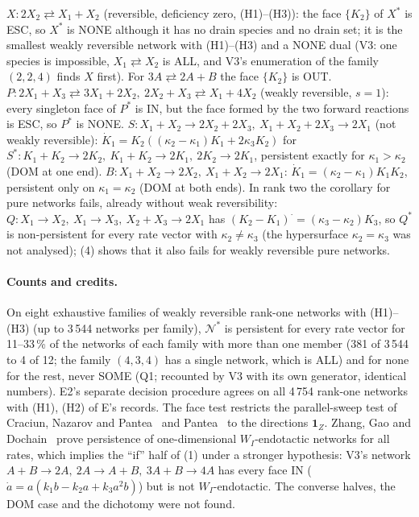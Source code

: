\documentclass[11pt,a4paper]{report}
\newcommand{\Nd}{\mathcal{N}^{*}}
\begin{document}
\begin{example}\label{ex:S1}
\(X\colon 2X_2\rightleftarrows X_1+X_2\) (reversible, deficiency zero, (H1)--(H3)): the face \(\{K_2\}\) of
\(X^*\) is ESC, so \(X^*\) is NONE although it has no drain species and no drain set; it is the smallest weakly
reversible network with (H1)--(H3) and a NONE dual (V3: one species is impossible, \(X_1\rightleftarrows X_2\) is ALL,
and V3's enumeration of the family \((2,2,4)\) finds \(X\) first). For \(3A\rightleftarrows2A+B\) the face \(\{K_2\}\) is OUT.
\(P\colon 2X_1+X_3\rightleftarrows3X_1+2X_2,\ 2X_2+X_3\rightleftarrows X_1+4X_2\) (weakly reversible, \(s=1\)): every
singleton face of \(P^*\) is IN, but the face formed by the two forward reactions is ESC, so \(P^*\) is NONE.
\(S\colon X_1+X_2\to2X_2+2X_3,\ X_1+X_2+2X_3\to2X_1\) (not weakly reversible): \(\dot K_1=K_2((\kappa_2-\kappa_1)K_1+2\kappa_3K_2)\)
for \(S^*\colon K_1+K_2\to2K_2,\ K_1+K_2\to2K_1,\ 2K_2\to2K_1\), persistent exactly for \(\kappa_1>\kappa_2\) (DOM at one end).
\(B\colon X_1+X_2\to2X_2,\ X_1+X_2\to2X_1\): \(\dot K_1=(\kappa_2-\kappa_1)K_1K_2\), persistent only on \(\kappa_1=\kappa_2\) (DOM at both
ends). In rank two the corollary for pure networks fails, already without weak reversibility:
\(Q\colon X_1\to X_2,\ X_1\to X_3,\ X_2+X_3\to2X_1\) has \((K_2-K_1)^\cdot=(\kappa_3-\kappa_2)K_3\), so \(Q^*\) is
non-persistent for every rate vector with \(\kappa_2\neq\kappa_3\) (the hypersurface \(\kappa_2=\kappa_3\) was not
analysed); (4) shows that it also fails for weakly reversible pure networks.
\end{example}

\paragraph{Counts and credits.} On eight exhaustive families of weakly reversible rank-one networks with (H1)--(H3)
(up to 3\,544 networks per family), \(\Nd\) is persistent for every rate vector for 11--33\,\% of the networks of each
family with more than one member (381 of 3\,544 to 4 of 12; the family \((4,3,4)\) has a single network, which is ALL)
and for none for the rest, never SOME (Q1; recounted by V3 with its own generator, identical numbers). E2's separate
decision procedure agrees on
all 4\,754 rank-one networks with (H1), (H2) of E's records. The face test restricts the parallel-sweep test of
Craciun, Nazarov and Pantea~\autocite{CraciunNazarovPantea2013} and Pantea~\autocite{Pantea2012} to the directions
\(\mathbf 1_Z\). Zhang, Gao and Dochain~\autocite[Thm~3.10]{ZhangGaoDochain2023} prove persistence of one-dimensional
\(W_I\)-endotactic networks for all rates, which implies the ``if'' half of (1) under a stronger
hypothesis: V3's network \(A+B\to2A,\ 2A\to A+B,\ 3A+B\to4A\) has every face IN (\(\dot a=a(k_1b-k_2a+k_3a^2b)\)) but is not
\(W_I\)-endotactic. The converse halves, the DOM case and the dichotomy were not found.
\end{document}
